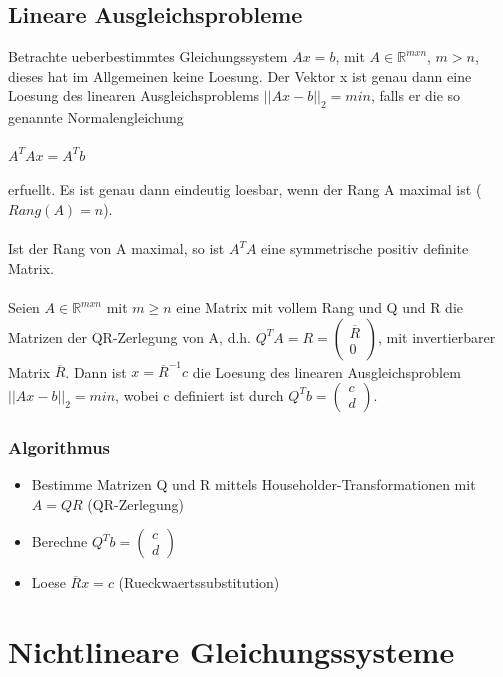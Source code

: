 \documentclass[a4paper]{scrreprt}
\begin{document}
\section{Lineare Ausgleichsprobleme}

Betrachte ueberbestimmtes Gleichungssystem $Ax = b$, mit $A \in \mathbb{R}^{mxn}$, $m > n$, dieses hat im Allgemeinen keine Loesung. Der Vektor x ist genau dann eine Loesung des linearen Ausgleichsproblems $||Ax - b||_2 = min$, falls er die so genannte Normalengleichung\\\\
$A^TAx = A^Tb$\\\\
erfuellt. Es ist genau dann eindeutig loesbar, wenn der Rang A maximal ist ($Rang(A) = n$).\\\\
Ist der Rang von A maximal, so ist $A^TA$ eine symmetrische positiv definite Matrix.\\\\

Seien $A \in \mathbb{R}^{mxn}$ mit $m \geq n$ eine Matrix mit vollem Rang und Q und R die Matrizen der QR-Zerlegung von A, d.h. $Q^TA = R = \begin{pmatrix}\overline{R}\\0\end{pmatrix}$, mit invertierbarer Matrix $\overline{R}$. Dann ist $x = \overline{R}^{-1}c$ die Loesung des linearen Ausgleichsproblem $||Ax - b||_2 = min$, wobei c definiert ist durch $Q^Tb = \begin{pmatrix}c\\d\end{pmatrix}$.

\subsection{Algorithmus}
\begin{itemize}
	\item Bestimme Matrizen Q und R mittels Householder-Transformationen mit $A = QR$ (QR-Zerlegung)
	\item Berechne $Q^Tb = \begin{pmatrix}c\\d\end{pmatrix}$
	\item Loese $\overline{R}x = c$ (Rueckwaertssubstitution)
\end{itemize}

\chapter{Nichtlineare Gleichungssysteme}
\end{document}
